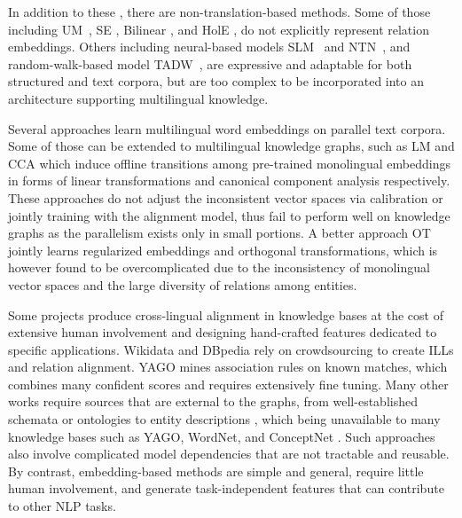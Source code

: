 \documentclass{article}
\begin{document}
In addition to these
, there are
non-translation-based methods. Some of those including UM~\cite{bordes2011learning}, SE \cite{bordes2012joint}, Bilinear \cite{jenatton2012latent}, and HolE \cite{nickel2016holographic}, do not explicitly represent relation embeddings.
Others including neural-based models SLM~\cite{collobert2008unified} and NTN~\cite{socher2013reasoning}, and random-walk-based model {TADW}~\cite{yang2015network}, are expressive and adaptable for both structured and text corpora, but are too complex to be incorporated into an architecture supporting
multilingual knowledge.
\par











Several approaches learn multilingual word embeddings
on parallel text corpora. Some of those can be extended to multilingual knowledge graphs, such as LM \cite{mikolov2013exploiting} and CCA \cite{faruqui2014improving} which induce offline transitions among pre-trained monolingual embeddings in forms of linear transformations and canonical component analysis respectively.
These approaches do not adjust the inconsistent vector spaces via calibration or jointly training with the \mbox{alignment} model, thus fail to perform well on knowledge graphs as
the parallelism exists only in small portions.
A better approach OT~\cite{xing2015normalized} jointly learns regularized embeddings and orthogonal transformations, which is however found to be overcomplicated due to the inconsistency of monolingual vector spaces and the large diversity of relations among entities.




 Some projects produce cross-lingual alignment in knowledge bases
at the cost of extensive human involvement and designing
hand-crafted features dedicated to specific applications.
Wikidata \cite{vrandevcic2012wikidata} and
DBpedia \cite{lehmann2015dbpedia} rely on crowdsourcing to create ILLs and relation alignment. YAGO \cite{mahdisoltani2014yago3} mines association rules on known matches, which combines many confident scores and requires extensively fine tuning.
Many other works require sources that are external to the graphs, from well-established schemata or ontologies \cite{nguyen2011multi,suchanek2011paris,rinser2013cross} to entity descriptions \cite{yang2015entity}, which being unavailable to many knowledge bases such as YAGO, WordNet, and ConceptNet \cite{speer2013conceptnet}.
Such approaches also involve complicated model dependencies that are not tractable and reusable.
By contrast, embedding-based methods
are simple and general, require little human involvement,
and generate task-independent features that can contribute to other NLP tasks.
\par
\end{document}
